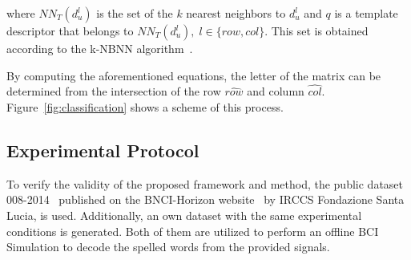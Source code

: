 \documentclass[utf8]{frontiersSCNS} %
\begin{document}
\begin{enumerate}
where $NN_T(d^l_u)$  is the set of the $k$ nearest neighbors to $d^l_u$ and $q$ is a template descriptor that belongs to $NN_T(d^l_u),\;l\in\{row,{col}\}$.  This set is obtained according to the k-NBNN  algorithm~\citep{Boiman2008}.


\end{enumerate}
By computing the aforementioned equations, the letter of the matrix can be determined from the intersection of the row $ \hat{row} $ and column $ \hat{col} $. 
Figure~\ref{fig:classification} shows a scheme of this process. 




\subsection{Experimental Protocol} \label{Protocol}

To verify the validity of the proposed framework and method, the public dataset 008-2014~\citep{Riccio2013} published on the BNCI-Horizon website~\citep{Brunner2014} by  IRCCS Fondazione Santa Lucia, is used. Additionally, an own dataset with  the same experimental conditions is generated. Both of them are utilized to perform an offline BCI Simulation to decode the spelled words from the provided signals. 
\end{document}
